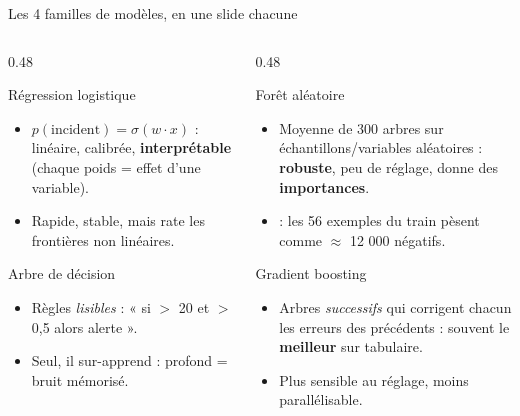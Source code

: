 \begin{frame}{Les 4 familles de modèles, en une slide chacune}
\footnotesize%
\begin{columns}[t]
\begin{column}{0.48\textwidth}
\begin{block}{Régression logistique}
\begin{itemize}
\item $p(\text{incident}) = \sigma(w \cdot x)$ : linéaire, calibrée,
\textbf{interprétable} (chaque poids = effet d'une variable).
\item Rapide, stable, mais rate les frontières non linéaires.
\end{itemize}
\end{block}
\begin{block}{Arbre de décision}
\begin{itemize}
\item Règles \emph{ lisibles} : « si  $>$ 20 et
 $>$ 0,5 alors alerte ».
\item Seul, il sur-apprend : profond = bruit mémorisé.
\end{itemize}
\end{block}
\end{column}
\begin{column}{0.48\textwidth}
\begin{block}{Forêt aléatoire}
\begin{itemize}
\item Moyenne de 300 arbres sur échantillons/variables aléatoires :
\textbf{robuste}, peu de réglage, donne des \textbf{importances}.
\item {} : les 56 exemples du train
pèsent comme $\approx$ 12 000 négatifs.
\end{itemize}
\end{block}
\begin{block}{Gradient boosting}
\begin{itemize}
\item Arbres \emph{successifs} qui corrigent chacun les erreurs des
précédents : souvent le \textbf{meilleur} sur tabulaire.
\item Plus sensible au réglage, moins parallélisable.
\end{itemize}
\end{block}
\end{column}
\end{columns}
\end{frame}

